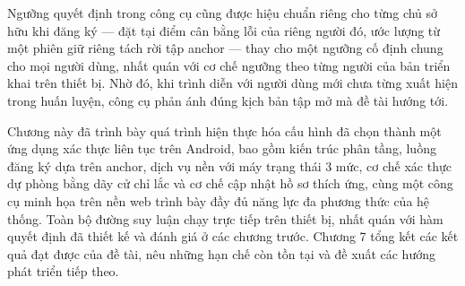 \documentclass[../DoAn.tex]{subfiles}
\begin{document}
Ngưỡng quyết định trong công cụ cũng được hiệu chuẩn riêng cho từng chủ sở hữu khi đăng ký — đặt tại điểm cân bằng lỗi của riêng người đó, ước lượng từ một phiên giữ riêng tách rời tập anchor — thay cho một ngưỡng cố định chung cho mọi người dùng, nhất quán với cơ chế ngưỡng theo từng người của bản triển khai trên thiết bị. Nhờ đó, khi trình diễn với người dùng mới chưa từng xuất hiện trong huấn luyện, công cụ phản ánh đúng kịch bản tập mở mà đề tài hướng tới.

Chương này đã trình bày quá trình hiện thực hóa cấu hình đã chọn thành một ứng dụng xác thực liên tục trên Android, bao gồm kiến trúc phân tầng, luồng đăng ký dựa trên anchor, dịch vụ nền với máy trạng thái 3 mức, cơ chế xác thực dự phòng bằng dãy cử chỉ lắc và cơ chế cập nhật hồ sơ thích ứng, cùng một công cụ minh họa trên nền web trình bày đầy đủ năng lực đa phương thức của hệ thống. Toàn bộ đường suy luận chạy trực tiếp trên thiết bị, nhất quán với hàm quyết định đã thiết kế và đánh giá ở các chương trước. Chương 7 tổng kết các kết quả đạt được của đề tài, nêu những hạn chế còn tồn tại và đề xuất các hướng phát triển tiếp theo.
\end{document}
